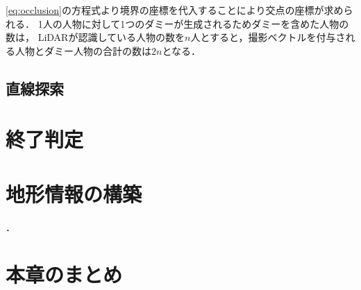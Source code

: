 \documentclass[autodetect-engine,dvipdfmx-if-dvi,ja=standard,a4j,jbase=11pt,magstyle=nomag*]{bxjsreport}
\begin{document}
\cref{eq:occlusion}の方程式より境界の座標を代入することにより交点の座標が求められる．
1人の人物に対して1つのダミーが生成されるためダミーを含めた人物の数は，
LiDARが認識している人物の数を$n$人とすると，撮影ベクトルを付与される人物とダミー人物の合計の数は$2n$となる．

\subsection{直線探索}


\section{終了判定}


\section{地形情報の構築}
．


\section{本章のまとめ}
\end{document}
